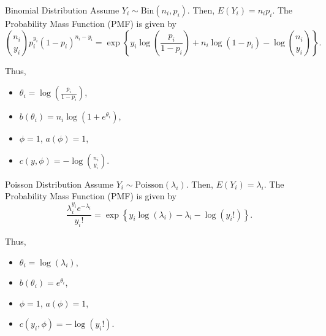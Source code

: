\documentclass[UTF8,a4paper,10pt]{article}
\begin{document}
  
\begin{mybox}{Binomial Distribution}
Assume $Y_i \sim \text{Bin}(n_i, p_i)$. Then, $E(Y_i) = n_i p_i$. The Probability Mass Function (PMF) is given by
\[
\binom{n_i}{y_i} p_i^{y_i} (1 - p_i)^{n_i - y_i} = \exp\left\{y_i \log \left(\frac{p_i}{1 - p_i}\right) + n_i \log(1 - p_i) - \log \binom{n_i}{y_i}\right\}.
\]

Thus, 
\begin{itemize}
  \item $\theta_i = \log\left(\frac{p_i}{1 - p_i}\right)$, 
  \item $b(\theta_i) = n_i \log(1 + e^{\theta_i})$, 
  \item $\phi = 1$, $a(\phi) = 1$,
  \item $c(y, \phi) = -\log \binom{n_i}{y_i}$.
\end{itemize}


\end{mybox}

\pagebreak
  
\begin{mybox}{Poisson Distribution}
Assume $Y_i \sim \text{Poisson}(\lambda_i)$. Then, $E(Y_i) = \lambda_i$. The Probability Mass Function (PMF) is given by
\[
\frac{\lambda_i^{y_i}e^{-\lambda_i}}{y_i!} = \exp\left\{y_i\log(\lambda_i) - \lambda_i - \log(y_i!)\right\}.
\]

Thus, 
\begin{itemize}
  \item $\theta_i = \log(\lambda_i)$, 
  \item $b(\theta_i) = e^{\theta_i}$, 
  \item $\phi = 1$, $a(\phi) = 1$, 
  \item $c(y_i, \phi) = -\log(y_i!)$.
\end{itemize}


\end{mybox}
\end{document}

